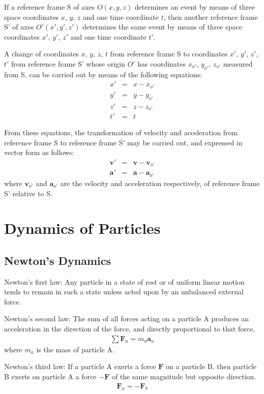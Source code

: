 \documentclass[12pt]{article}
\newcommand{\vV}{\mathbf{v}}
\newcommand{\vA}{\mathbf{a}}
\newcommand{\vF}{\mathbf{F}}
\newcommand{\mX}{x}
\newcommand{\mY}{y}
\newcommand{\mZ}{z}
\newcommand{\mT}{t}
\newcommand{\mM}{m}
\newcommand{\rt}{'}
\newcommand{\ra}{_a}
\newcommand{\rb}{_b}
\newcommand{\rot}{_{o'}}
\begin{document}
\par If a reference frame S of axes $O(\mX,\mY,\mZ)$ determines an event by means of three space coordinates $\mX$, $\mY$, $\mZ$ and one time coordinate $\mT$, then another reference frame S' of axes $O\rt(\mX\rt,\mY\rt,\mZ\rt)$ determines the same event by means of three space coordinates $\mX\rt$, $\mY\rt$, $\mZ\rt$ and one time coordinate $\mT\rt$.
\par A change of coordinates $\mX$, $\mY$, $\mZ$, $\mT$ from reference frame S to coordinates $\mX\rt$, $\mY\rt$, $\mZ\rt$, $\mT\rt$ from reference frame S' whose origin $O\rt$ has coordinates $\mX\rot$, $\mY\rot$, $\mZ\rot$ measured from S, can be carried out by means of the following equations:
\begin{eqnarray*}
\mX\rt & = & \mX - \mX\rot \\
\mY\rt & = & \mY - \mY\rot \\
\mZ\rt & = & \mZ - \mZ\rot \\
\mT\rt & = & \mT
\end{eqnarray*}
\par From these equations, the transformation of velocity and acceleration from reference frame S to reference frame S' may be carried out, and expressed in vector form as follows:
\begin{eqnarray*}
\vV\rt & = & \vV - \vV\rot \\
\vA\rt & = & \vA - \vA\rot
\end{eqnarray*}
\noindent where $\vV\rot$ and $\vA\rot$ are the velocity and acceleration respectively, of reference frame S' relative to S.

\bigskip

{\centering\section{Dynamics of Particles}}

{\centering\subsection{Newton's Dynamics}}

\par Newton's first law: Any particle in a state of rest or of uniform linear motion tends to remain in such a state unless acted upon by an unbalanced external force.
\par Newton's second law: The sum of all forces acting on a particle A produces an acceleration in the direction of the force, and directly proportional to that force.
\begin{eqnarray*}
\sum \vF\ra = \mM\ra\vA\ra
\end{eqnarray*}
\noindent where $\mM\ra$ is the mass of particle A.
\par Newton's third law: If a particle A exerts a force $\vF$ on a particle B, then particle B exerts on particle A a force $-\vF$ of the same magnitude but opposite direction.
\begin{eqnarray*}
\vF\ra = -\vF\rb
\end{eqnarray*}
\end{document}
